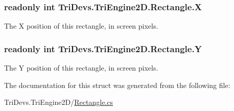\hypertarget{struct_tri_devs_1_1_tri_engine2_d_1_1_rectangle_af18eb626ddefe409db12bc6f88dc56ac}{
\subsubsection[{X}]{\setlength{\rightskip}{0pt plus 5cm}readonly int Tri\-Devs.\-Tri\-Engine2\-D.\-Rectangle.\-X}}\label{struct_tri_devs_1_1_tri_engine2_d_1_1_rectangle_af18eb626ddefe409db12bc6f88dc56ac}


The X position of this rectangle, in screen pixels. 

\hypertarget{struct_tri_devs_1_1_tri_engine2_d_1_1_rectangle_a52773c5bc13a3e4b9a494879d2c0692f}{
\subsubsection[{Y}]{\setlength{\rightskip}{0pt plus 5cm}readonly int Tri\-Devs.\-Tri\-Engine2\-D.\-Rectangle.\-Y}}\label{struct_tri_devs_1_1_tri_engine2_d_1_1_rectangle_a52773c5bc13a3e4b9a494879d2c0692f}


The Y position of this rectangle, in screen pixels. 



The documentation for this struct was generated from the following file\-:\begin{DoxyCompactItemize}
\item 
Tri\-Devs.\-Tri\-Engine2\-D/\hyperlink{_rectangle_8cs}{Rectangle.\-cs}\end{DoxyCompactItemize}
